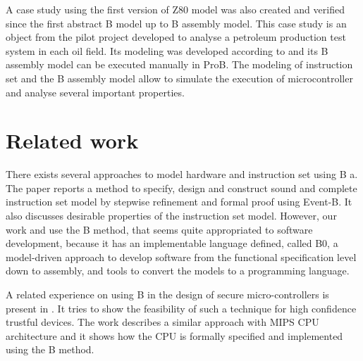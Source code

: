 \documentclass[a4paper]{llncs}
\begin{document}
A case study using the first version of Z80 model was also created and verified
since the first abstract B model up to B assembly model. This case study is an
object from the pilot project developed to analyse a petroleum production test
system in each oil field. Its modeling was developed according to \cite{LAUT_SERGIO}
and its B assembly model can be executed manually in ProB. The modeling of
instruction set and the B assembly model allow to simulate the execution of microcontroller
and analyse several important properties.

%

\section{Related work}
\label{sec:relatedworks}

There exists several approaches to model hardware and instruction set
using B a.  The paper \cite{springerlink:Yuan2011} reports a method to
specify, design and construct sound and complete instruction set model
by stepwise refinement and formal proof using Event-B. It also
discusses desirable properties of the instruction set model. However,
our work \cite{Valerio_SBMF09} and \cite{Subotic2010} use the B
method, that seems quite appropriated to software development, because
it has an implementable language defined, called B0, a model-driven
approach \cite{Dantas_SBMF08} to develop software from the functional
specification level down to assembly, and tools to convert the models
to a programming language. 

A related experience on using B in the design of secure
micro-controllers is present in \cite{Marc20113}. It tries to show the
feasibility of such a technique for high confidence trustful
devices. The work \cite{Subotic2010} describes a similar approach with
MIPS CPU architecture and it shows how the CPU is formally specified
and implemented using the B method.

% 
%
%
%
\end{document}
